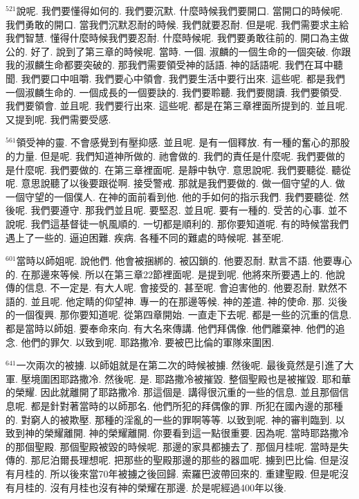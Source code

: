 \documentclass{book}
\begin{document}
$^{521}$說呢.
我們要懂得如何的.
我們要沉默.
什麼時候我們要開口.
當開口的時候呢.
我們勇敢的開口.
當我們沉默忍耐的時候.
我們就要忍耐.
但是呢.
我們需要求主給我們智慧.
懂得什麼時候我們要忍耐.
什麼時候呢.
我們要勇敢往前的.
開口為主做公的.
好了.
說到了第三章的時候呢.
當時.
一個.
淑麟的一個生命的一個突破.
你跟我的淑麟生命都要突破的.
那我們需要領受神的話語.
神的話語呢.
我們在耳中聽聞.
我們要口中咀嚼.
我們要心中領會.
我們要生活中要行出來.
這些呢.
都是我們一個淑麟生命的.
一個成長的一個要訣的.
我們要聆聽.
我們要閱讀.
我們要領受.
我們要領會.
並且呢.
我們要行出來.
這些呢.
都是在第三章裡面所提到的.
並且呢.
又提到呢.
我們需要受感.

$^{561}$領受神的靈.
不會感覺到有壓抑感.
並且呢.
是有一個釋放.
有一種的奮心的那股的力量.
但是呢.
我們知道神所做的.
祂會做的.
我們的責任是什麼呢.
我們要做的是什麼呢.
我們要做的.
在第三章裡面呢.
是靜中執守.
意思說呢.
我們要聽從.
聽從呢.
意思說聽了以後要跟從啊.
接受警戒.
那就是我們要做的.
做一個守望的人.
做一個守望的一個僕人.
在神的面前看到他.
他的手如何的指示我們.
我們要聽從.
然後呢.
我們要遵守.
那我們並且呢.
要堅忍.
並且呢.
要有一種的.
受苦的心事.
並不說呢.
我們這基督徒一帆風順的.
一切都是順利的.
那你要知道呢.
有的時候當我們遇上了一些的.
逼迫困難.
疾病.
各種不同的難處的時候呢.
甚至呢.

$^{601}$當時以師姐呢.
說他們.
他會被捆綁的.
被囚鎖的.
他要忍耐.
默言不語.
他要專心的.
在那邊來等候.
所以在第三章22節裡面呢.
是提到呢.
他將來所要遇上的.
他說傳的信息.
不一定是.
有大人呢.
會接受的.
甚至呢.
會迫害他的.
他要忍耐.
默然不語的.
並且呢.
他定睛的仰望神.
專一的在那邊等候.
神的差遣.
神的使命.
那.
災後的一個復興.
那你要知道呢.
從第四章開始.
一直走下去呢.
都是一些的沉重的信息.
都是當時以師姐.
要奉命來向.
有大名來傳講.
他們拜偶像.
他們離棄神.
他們的追念.
他們的罪欠.
以致到呢.
耶路撒冷.
要被巴比倫的軍隊來圍困.

$^{641}$一次兩次的被擄.
以師姐就是在第二次的時候被擄.
然後呢.
最後竟然是引進了大軍.
壓境圍困耶路撒冷.
然後呢.
是.
耶路撒冷被摧毀.
整個聖殿也是被摧毀.
耶和華的榮耀.
因此就離開了耶路撒冷.
那這個是.
講得很沉重的一些的信息.
並且那個信息呢.
都是針對著當時的以師那名.
他們所犯的拜偶像的罪.
所犯在國內邊的那種的.
對窮人的被欺壓.
那種的淫亂的一些的罪啊等等.
以致到呢.
神的審判臨到.
以致到神的榮耀離開.
神的榮耀離開.
你要看到這一點很重要.
因為呢.
當時耶路撒冷的那個聖殿.
那個聖殿被毀的時候呢.
那邊的家具都擄去了.
那個月桂呢.
當時是失傳的.
那尼泊爾長理想呢.
把那些的聖殿那邊的那些的器皿呢.
擄到巴比倫.
但是沒有月桂的.
所以後來當70年被擄之後回歸.
索羅巴波帶回來的.
重建聖殿.
但是呢沒有月桂的.
沒有月桂也沒有神的榮耀在那邊.
於是呢經過400年以後.
\end{document}
